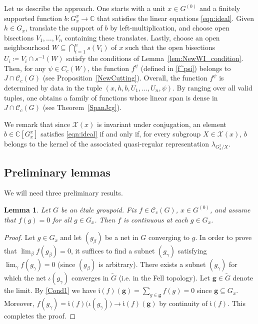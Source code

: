 \documentclass[11pt, oneside, reqno]{amsart}
\newcommand{\Gu}{G^{(0)}}
\newcommand{\cg}{\mathscr{C}_c(G)}
\newcommand{\tiG}{\tilde{G}}
\newcommand{\mfi}{\mathfrak i}
\newtheorem{lem}[thm]{Lemma}
\theoremstyle{definition}
\theoremstyle{remark}
\numberwithin{equation}{section}
\begin{document}
\vspace{0.3cm}
Let us describe the approach. One starts with a unit $x \in \Gu$ and a finitely supported function $b \colon G^x_x \to \mathbb{C}$ that satisfies the linear equations \eqref{eqn:ideal}. Given $h \in G_x$, translate the support of $b$ by left-multiplication, and choose open bisections $V_1, \dots, V_n$ containing these translates. Lastly, choose an open neighbourhood $W \subseteq \bigcap_{i=1}^n s(V_i)$ of $x$ such that the open bisections $U_i \coloneq V_i \cap s^{-1}(W)$ satisfy the conditions of Lemma~\ref{lem:NewWI_condition}. Then, for any $\psi \in C_c(W)$, the function $f^\psi$ (defined in \eqref{f^psi}) belongs to $J \cap \cg$ (see Proposition~\ref{NewCutting}). Overall, the function $f^\psi$ is determined by data in the tuple $(x,h,b,U_1, \dots,U_n,\psi)$. By ranging over all valid tuples, one obtains a family of functions whose linear span is dense in $J \cap \cg$ (see Theorem~\ref{SpanJcg}).

We remark that since $\mathcal{X}(x)$ is invariant under conjugation, an element $b \in \mathbb{C}[G^x_x]$ satisfies \eqref{eqn:ideal} if and only if, for every subgroup $X \in \mathcal{X}(x)$, $b$ belongs to the kernel of the associated quasi-regular representation $\lambda_{G^x_x/X}$.

\subsection{Preliminary lemmas} We will need three preliminary results.

\begin{lem}\label{EqualOnFib}
    Let $G$ be an \'etale groupoid. Fix $f \in \cg$, $x \in \Gu$, and assume that $f(g) = 0$ for all $g \in G_x$. Then $f$ is continuous at each $g \in G_x$.
\end{lem}

\begin{proof}
    Let $g \in G_x$ and let $(g_\beta)$ be a net in $G$ converging to $g$. In order to prove that $\lim_\beta f(g_\beta) = 0$, it suffices to find a subnet $(g_\gamma)$ satisfying $\lim_\gamma f(g_\gamma) = 0$ (since $(g_\beta)$ is arbitrary). There exists a subnet $(g_\gamma)$ for which the net $\iota(g_\gamma)$ converges in $\tiG$ (i.e. in the Fell topology). Let $\bm{g} \in \tiG$ denote the limit. By \eqref{Cond1} we have $\mfi(f)(\bm{g}) = \sum_{g \in \bm{g}} f(g) = 0$ since $\bm{g} \subseteq G_x$. Moreover, $f(g_\gamma) = \mfi(f)\big(\iota(g_\gamma)\big) \to \mfi(f)(\bm{g})$ by continuity of $\mfi(f)$. This completes the proof.
\end{proof}
\end{document}
